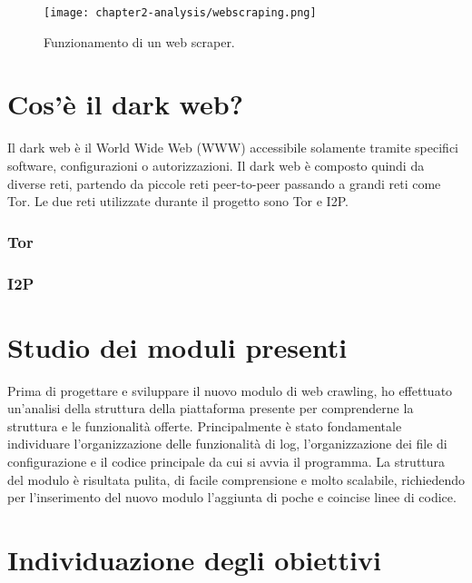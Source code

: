 \begin{figure}[!h] 
    \centering 
    \texttt{[image: chapter2-analysis/webscraping.png]} 
    \caption{Funzionamento di un web scraper.}
\end{figure}

\section{Cos'è il dark web?}
Il dark web è il World Wide Web (WWW) accessibile solamente tramite specifici software, configurazioni o autorizzazioni. Il dark web è composto quindi da diverse reti, partendo da piccole reti peer-to-peer passando a grandi reti come Tor.
Le due reti utilizzate durante il progetto sono Tor e I2P.

\subsubsection{Tor}
\subsubsection{I2P}

\section{Studio dei moduli presenti}

Prima di progettare e sviluppare il nuovo modulo di web crawling, ho effettuato un’analisi della struttura della piattaforma presente per comprenderne la struttura e le funzionalità offerte. Principalmente è stato fondamentale individuare l'organizzazione delle funzionalità di log, l'organizzazione dei file di configurazione e il codice principale da cui si avvia il programma. La struttura del modulo è risultata pulita, di facile comprensione e molto scalabile, richiedendo per l'inserimento del nuovo modulo l'aggiunta di poche e coincise linee di codice.


\section{Individuazione degli obiettivi}

